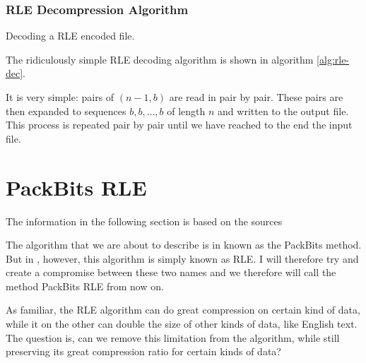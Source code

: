 \subsubsection{RLE Decompression Algorithm}

\begin{algorithm}
  \caption{Decoding a RLE encoded file.}
  \label{alg:rle-dec}
  \begin{algorithmic}[1]


    \While{\neof}
    \State {}
    \EndRepeatn


    \EndWhile
  \end{algorithmic}
\end{algorithm}

The ridiculously simple RLE decoding algorithm is shown in algorithm
\ref{alg:rle-dec}.

It is very simple: pairs of $(n-1,b)$ are read in pair by pair. These
pairs are then expanded to sequences $b,b,\dots,b$ of length $n$ and
written to the output file. This process is repeated pair by pair
until we have reached to the end the input file.

\section{PackBits RLE}
\label{sec:packbits-rle}

The information in the following section is based on the sources
\cite{96:_techn_note_tn102,apple1994inside,91:_truev_tga_file_format_specif}

The algorithm that we are about to describe is in
\cite{96:_techn_note_tn102,apple1994inside} known as the PackBits
method. But in \cite{91:_truev_tga_file_format_specif}, however, this
algorithm is simply known as RLE. I will therefore try and create a
compromise between these two names and we therefore will call the
method PackBits RLE from now on.

As familiar, the RLE algorithm can do great compression on certain
kind of data, while it on the other can double the size of other kinds
of data, like English text. The question is, can we remove this
limitation from the algorithm, while still preserving its great
compression ratio for certain kinds of data?

